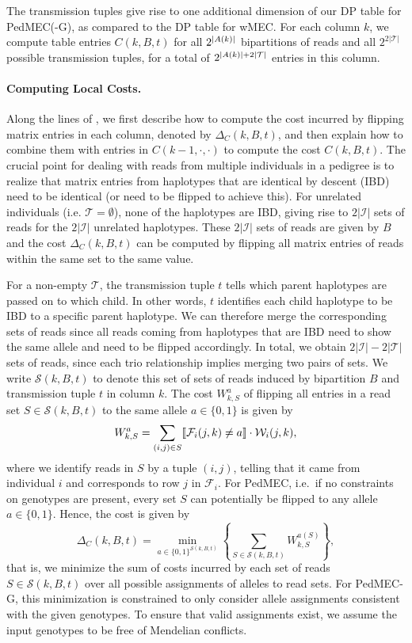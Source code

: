 The transmission tuples give rise to one additional dimension of our DP table for PedMEC(-G), as compared to the DP table for wMEC.
For each column $k$, we compute table entries $C(k,B,t)$ for all $2^{\left\lvert A(k) \right\rvert}$ bipartitions of reads and all $2^{2|\mathcal{T}|}$ possible transmission tuples, for a total of $2^{{\left\lvert A(k) \right\rvert}+2{\left\lvert \mathcal{T} \right\rvert}}$ entries in this column.

\paragraph{Computing Local Costs.}
Along the lines of \cite{Patterson2015}, we first describe how to compute the cost incurred by flipping matrix entries in each column, denoted by $\Delta_C(k,B,t)$, and then explain how to combine them with entries in $C(k-1,\cdot,\cdot)$ to compute the cost $C(k,B,t)$.
The crucial point for dealing with reads from multiple individuals in a pedigree is to realize that matrix entries from haplotypes that are identical by descent (IBD) need to be identical (or need to be flipped to achieve this).
For unrelated individuals (i.e. $\mathcal{T}=\emptyset$), none of the haplotypes are IBD, giving rise to $2|\mathcal{I}|$ sets of reads for the $2|\mathcal{I}|$ unrelated haplotypes.
These $2|\mathcal{I}|$ sets of reads are given by $B$ and the cost $\Delta_C(k,B,t)$ can be computed by flipping all matrix entries of reads within the same set to the same value.

For a non-empty $\mathcal{T}$, the transmission tuple $t$ tells which parent haplotypes are passed on to which child.
In other words, $t$ identifies each child haplotype to be IBD to a specific parent haplotype.
We can therefore merge the corresponding sets of reads since all reads coming from haplotypes that are IBD need to show the same allele and need to be flipped accordingly.
In total, we obtain $2|\mathcal{I}| - 2|\mathcal{T}|$ sets of reads, since each trio relationship implies merging two pairs of sets.
We write $\mathcal{S}(k,B,t)$ to denote this set of sets of reads induced by bipartition $B$ and transmission tuple $t$ in column $k$.
The cost $W_{k,S}^a$ of flipping all entries in a read set $S\in \mathcal{S}(k,B,t)$ to the same allele $a\in\{0,1\}$ is given by 
\[W_{k,S}^a = \sum_{(i,j)\in S}\llbracket \mathcal{F}_i(j,k)\neq a\rrbracket\cdot\mathcal{W}_i(j,k),\]
where we identify reads in $S$ by a tuple $(i,j)$, telling that it came from individual $i$ and corresponds to row $j$ in $\mathcal{F}_i$.
For PedMEC, i.e.\ if no constraints on genotypes are present, every set $S$ can potentially be flipped to any allele $a\in\{0,1\}$.
Hence, the cost is given by 
\begin{equation}\label{eqn:delta_c}
\Delta_C(k,B,t)= \min_{a\in \{0,1\}^{\mathcal{S}(k,B,t)}}\left\{\sum_{S\in\mathcal{S}(k,B,t)}W_{k,S}^{a(S)}\right\},
\end{equation}
that is, we minimize the sum of costs incurred by each set of reads $S\in\mathcal{S}(k,B,t)$ over all possible assignments of alleles to read sets.
For PedMEC-G, this minimization is constrained to only consider allele assignments consistent with the given genotypes.
To ensure that valid assignments exist, we assume the input genotypes to be free of Mendelian conflicts.


